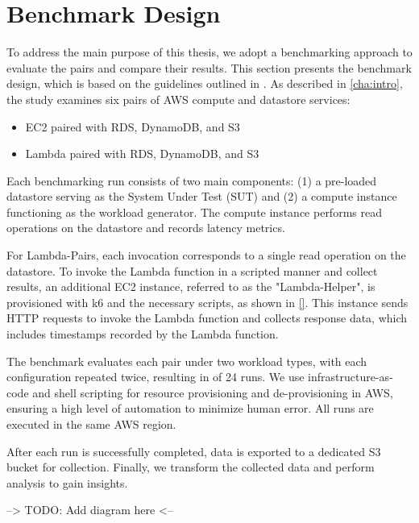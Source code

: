 \section{Benchmark Design}
\label{cha:approach}

To address the main purpose of this thesis, we adopt a benchmarking approach to evaluate the pairs and compare their results. This section presents the benchmark design, which is based on the guidelines outlined in \cite{}. As described in \cref{cha:intro}, the study examines six pairs of AWS compute and datastore services:

\begin{itemize}
	\item EC2 paired with RDS, DynamoDB, and S3
	\item Lambda paired with RDS, DynamoDB, and S3
\end{itemize}

Each benchmarking run consists of two main components: (1) a pre-loaded datastore serving as the System Under Test (SUT) and (2) a compute instance functioning as the workload generator. The compute instance performs read operations on the datastore and records latency metrics.

For Lambda-Pairs, each invocation corresponds to a single read operation on the datastore. To invoke the Lambda function in a scripted manner and collect results, an additional EC2 instance, referred to as the "Lambda-Helper", is provisioned with k6 and the necessary scripts, as shown in \ref{}. This instance sends HTTP requests to invoke the Lambda function and collects response data, which includes timestamps recorded by the Lambda function.

The benchmark evaluates each pair under two workload types, with each configuration repeated twice, resulting in of 24 runs. We use infrastructure-as-code and shell scripting for resource provisioning and de-provisioning in AWS, ensuring a high level of automation to minimize human error. All runs are executed in the same AWS region.

After each run is successfully completed, data is exported to a dedicated S3 bucket for collection. Finally, we transform the collected data and perform analysis to gain insights.

--> TODO: Add diagram here <--
